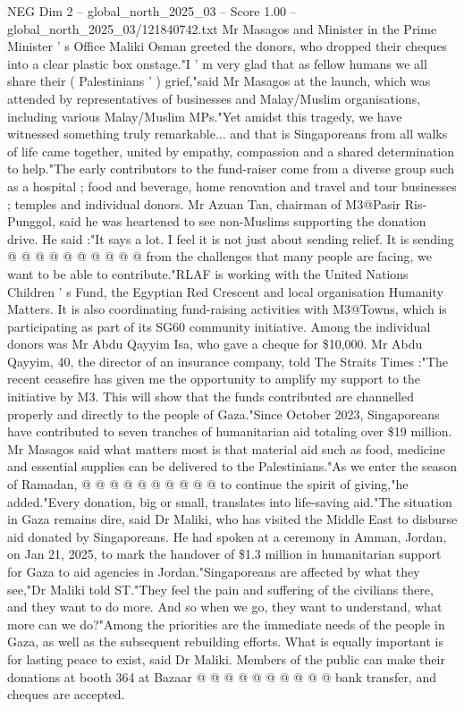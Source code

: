 \begin{textsample}{NEG Dim 2 – global\_north\_2025\_03 – Score 1.00 – global\_north\_2025\_03/121840742.txt}  \label{ex:f2_neg_032}
Mr Masagos and Minister in the Prime Minister ' s Office Maliki Osman greeted the donors, who dropped their cheques into a clear plastic box onstage."I ' m very glad that as fellow humans we all share their ( Palestinians ' ) grief,"said Mr Masagos at the launch, which was attended by representatives of businesses and Malay/Muslim organisations, including various Malay/Muslim MPs."Yet amidst this tragedy, we have witnessed something truly remarkable... and that is Singaporeans from all walks of life came together, united by empathy, compassion and a shared determination to help."The early contributors to the fund-raiser come from a diverse group such as a hospital ; food and beverage, home renovation and travel and tour businesses ; temples and individual donors.
Mr Azuan Tan, chairman of M3@Pasir Ris-Punggol, said he was heartened to see non-Muslims supporting the donation drive.
He said :"It says a lot.
I feel it is not just about sending relief.
It is sending @ @ @ @ @ @ @ @ @ @ from the challenges that many people are facing, we want to be able to contribute."RLAF is working with the United Nations Children ' s Fund, the Egyptian Red Crescent and local organisation Humanity Matters.
It is also coordinating fund-raising activities with M3@Towns, which is participating as part of its SG60 community initiative.
Among the individual donors was Mr Abdu Qayyim Isa, who gave a cheque for \$10,000.
Mr Abdu Qayyim, 40, the director of an insurance company, told The Straits Times :"The recent ceasefire has given me the opportunity to amplify my support to the initiative by M3.
This will show that the funds contributed are channelled properly and directly to the people of Gaza."Since October 2023, Singaporeans have contributed to seven tranches of humanitarian aid totaling over \$19 million.
Mr Masagos said what matters most is that material aid such as food, medicine and essential supplies can be delivered to the Palestinians."As we enter the season of Ramadan, @ @ @ @ @ @ @ @ @ @ to continue the spirit of giving,"he added."Every donation, big or small, translates into life-saving aid."The situation in Gaza remains dire, said Dr Maliki, who has visited the Middle East to disburse aid donated by Singaporeans.
He had spoken at a ceremony in Amman, Jordan, on Jan 21, 2025, to mark the handover of \$1.3 million in humanitarian support for Gaza to aid agencies in Jordan."Singaporeans are affected by what they see,"Dr Maliki told ST."They feel the pain and suffering of the civilians there, and they want to do more.
And so when we go, they want to understand, what more can we do?"Among the priorities are the immediate needs of the people in Gaza, as well as the subsequent rebuilding efforts.
What is equally important is for lasting peace to exist, said Dr Maliki.
Members of the public can make their donations at booth 364 at Bazaar @ @ @ @ @ @ @ @ @ @ bank transfer, and cheques are accepted.

\end{textsample}
